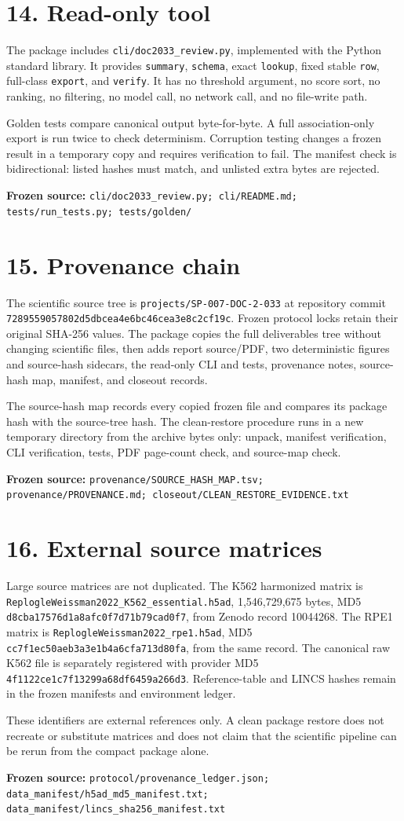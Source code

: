 \documentclass[10pt]{article}
\newcommand{\src}[1]{\par\vfill\noindent\parbox{\linewidth}{\raggedright\sloppy\scriptsize\color{BorderBlue}\textbf{Frozen source:} \texttt{#1}}}
\newcommand{\pg}[2]{\section*{#1}#2}
\begin{document}
\pg{14. Read-only tool}{The package includes \texttt{cli/doc2033\_review.py}, implemented with the Python standard library. It provides \texttt{summary}, \texttt{schema}, exact \texttt{lookup}, fixed stable \texttt{row}, full-class \texttt{export}, and \texttt{verify}. It has no threshold argument, no score sort, no ranking, no filtering, no model call, no network call, and no file-write path.\par Golden tests compare canonical output byte-for-byte. A full association-only export is run twice to check determinism. Corruption testing changes a frozen result in a temporary copy and requires verification to fail. The manifest check is bidirectional: listed hashes must match, and unlisted extra bytes are rejected.\src{cli/doc2033\_review.py; cli/README.md; tests/run\_tests.py; tests/golden/}}\newpage

\pg{15. Provenance chain}{The scientific source tree is \texttt{projects/SP-007-DOC-2-033} at repository commit \texttt{7289559057802d5dbcea4e6bc46cea3e8c2cf19c}. Frozen protocol locks retain their original SHA-256 values. The package copies the full deliverables tree without changing scientific files, then adds report source/PDF, two deterministic figures and source-hash sidecars, the read-only CLI and tests, provenance notes, source-hash map, manifest, and closeout records.\par The source-hash map records every copied frozen file and compares its package hash with the source-tree hash. The clean-restore procedure runs in a new temporary directory from the archive bytes only: unpack, manifest verification, CLI verification, tests, PDF page-count check, and source-map check.\src{provenance/SOURCE\_HASH\_MAP.tsv; provenance/PROVENANCE.md; closeout/CLEAN\_RESTORE\_EVIDENCE.txt}}\newpage

\pg{16. External source matrices}{Large source matrices are not duplicated. The K562 harmonized matrix is \texttt{ReplogleWeissman2022\_K562\_essential.h5ad}, 1,546,729,675 bytes, MD5 \texttt{d8cba17576d1a8afc0f7d71b79cad0f7}, from Zenodo record 10044268. The RPE1 matrix is \texttt{ReplogleWeissman2022\_rpe1.h5ad}, MD5 \texttt{cc7f1ec50aeb3a3e1b4a6cfa713d80fa}, from the same record. The canonical raw K562 file is separately registered with provider MD5 \texttt{4f1122ce1c7f13299a68df6459a266d3}. Reference-table and LINCS hashes remain in the frozen manifests and environment ledger.\par These identifiers are external references only. A clean package restore does not recreate or substitute matrices and does not claim that the scientific pipeline can be rerun from the compact package alone.\src{protocol/provenance\_ledger.json; data\_manifest/h5ad\_md5\_manifest.txt; data\_manifest/lincs\_sha256\_manifest.txt}}\newpage
\end{document}
